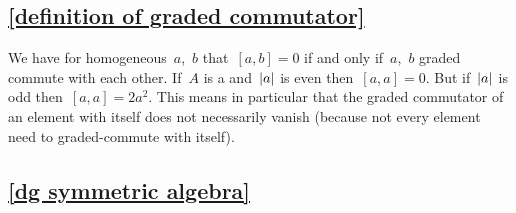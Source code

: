 \subsection{\cref{definition of graded commutator}}
\label{definition of graded commutator remark}

We have for homogeneous~$a$,~$b$ that~$[a,b] = 0$ if and only if~$a$,~$b$ graded commute with each other.
If~$A$ is a {\dga} and~$\lvert a\rvert$ is even then~$[a,a] = 0$.
But if~$\lvert a\rvert$ is odd then~$[a,a] = 2 a^2$.
This means in particular that the graded commutator of an element with itself does not necessarily vanish (because not every element need to graded-commute with itself).





\subsection{\cref{dg symmetric algebra}}
\label{dg symmetric algebra proof}

